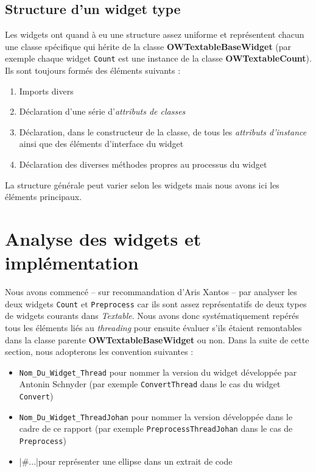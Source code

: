 \documentclass{article}
\begin{document}
\subsection{Structure d'un widget type}

Les widgets ont quand à eu une structure assez uniforme et représentent chacun une classe spécifique qui hérite de la classe \textbf{OWTextableBaseWidget} (par exemple chaque widget \texttt{Count} est une instance de la classe \textbf{OWTextableCount}). Ils sont toujours formés des éléments suivants : 

\begin{enumerate}
    \item Imports divers
    \item Déclaration d'une série d'\textit{attributs de classes}
    \item Déclaration, dans le constructeur de la classe, de tous les \textit{attributs d'instance} ainsi que des éléments d'interface du widget
    \item Déclaration des diverses méthodes propres au processus du widget
\end{enumerate}

La structure générale peut varier selon les widgets mais nous avons ici les éléments principaux.

\section{Analyse des widgets et implémentation}

Nous avons commencé – sur recommandation d'Aris Xantos – par analyser les deux widgets \texttt{Count} et \texttt{Preprocess} car ils sont assez représentatifs de deux types de widgets courants dans \textit{Textable}. Nous avons donc systématiquement repérés tous les éléments liés au \textit{threading} pour ensuite évaluer s'ils étaient remontables dans la classe parente \textbf{OWTextableBaseWidget} ou non. Dans la suite de cette section, nous adopterons les convention suivantes : 

\begin{itemize}
    \item \texttt{Nom\_Du\_Widget\_Thread} pour nommer la version du widget développée par Antonin Schnyder (par exemple \texttt{ConvertThread} dans le cas du widget \texttt{Convert})
    \item \texttt{Nom\_Du\_Widget\_ThreadJohan} pour nommer la version développée dans le cadre de ce rapport (par exemple \texttt{PreprocessThreadJohan} dans le cas de \texttt{Preprocess})
    \item {}|#...|pour représenter une ellipse dans un extrait de code
\end{itemize}
\end{document}
